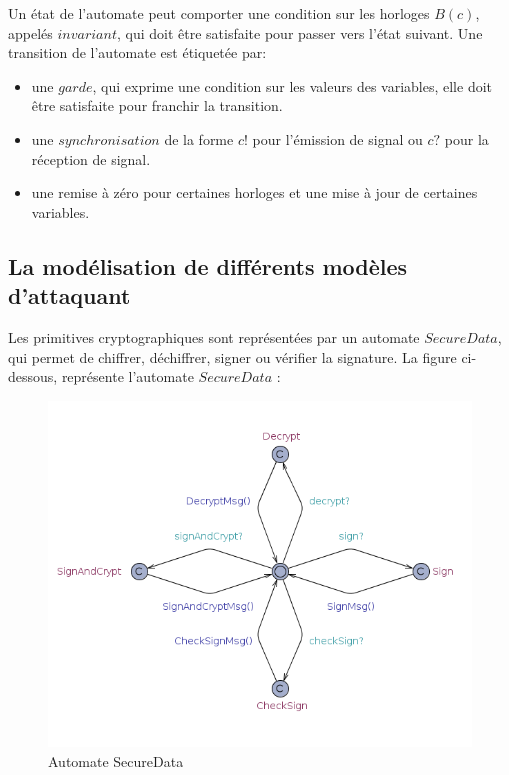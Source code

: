 \documentclass[10pt,a4paper]{article}
\begin{document}
Un état de l'automate peut comporter une condition sur les horloges $B(c)$, appelés $invariant$, qui doit \^{e}tre satisfaite pour passer vers l'état suivant. Une transition de l'automate est étiquetée par:
\begin{itemize}
\item une $garde$, qui exprime une condition sur les valeurs des variables, elle doit \^{e}tre satisfaite pour franchir la transition.
\item une $synchronisation$ de la forme $c!$ pour l'émission de signal ou $c?$ pour la réception de signal.
\item une remise à zéro pour certaines horloges et une mise à jour de certaines variables.
\end{itemize}

\subsection{La modélisation de différents modèles d'attaquant}
Les primitives cryptographiques sont représentées par un automate $SecureData$, qui permet de chiffrer, déchiffrer, signer ou vérifier la signature. La figure ci-dessous, représente l'automate $SecureData$ :
\begin{figure}[!h]
\begin{center}
\includegraphics[scale=0.5]{img/secureData.png}\newline
\caption{Automate SecureData}
\end{center}
\end{figure}
\end{document}
